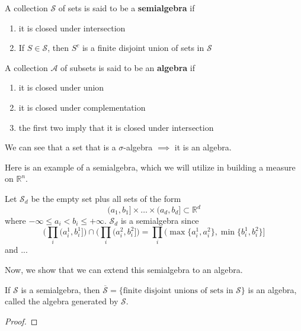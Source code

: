   \begin{definition}
    A collection $\mathcal{S}$ of sets is said to be a \textbf{semialgebra} if 
    \begin{enumerate}
      \item it is closed under intersection 
      \item If $S \in \mathcal{S}$, then $S^c$ is a finite disjoint union of sets in $\mathcal{S}$
    \end{enumerate}
    A collection $\mathcal{A}$ of subsets is said to be an \textbf{algebra} if 
    \begin{enumerate}
      \item it is closed under union 
      \item it is closed under complementation
      \item the first two imply that it is closed under intersection
    \end{enumerate}
    We can see that a set that is a $\sigma$-algebra $\implies$ it is an algebra. 
  \end{definition}

  Here is an example of a semialgebra, which we will utilize in building a measure on $\mathbb{R}^n$.  

  \begin{example}
    Let $\mathcal{S}_d$ be the empty set plus all sets of the form 
    \begin{equation}
      (a_1, b_1] \times \ldots \times (a_d, b_d] \subset \mathbb{R}^d
    \end{equation}
    where $-\infty \leq a_i < b_i \leq +\infty$. $\mathcal{S}_d$ is a semialgebra since 
    \begin{equation}
      \bigg( \prod_i (a_i^1 , b_i^1] \bigg) \cap \bigg( \prod_i (a_i^2, b_i^2] \bigg) = \prod_i (\max\{a_i^1, a_i^2\}, \min\{b_i^1, b_i^2\}]
    \end{equation}
    and ...
  \end{example}

  Now, we show that we can extend this semialgebra to an algebra. 

  \begin{lemma}
    If $\mathcal{S}$ is a semialgebra, then $\overline{\mathcal{S}} = \{\text{finite disjoint unions of sets in } \mathcal{S}\}$ is an algebra, called the algebra generated by $\mathcal{S}$. 
  \end{lemma}
  \begin{proof}

  \end{proof}

